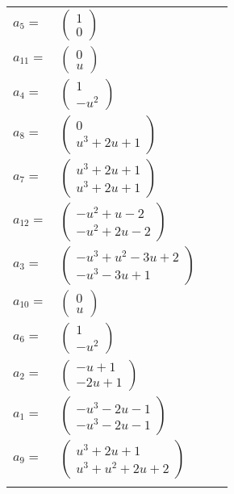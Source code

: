 \documentclass[1p]{elsarticle_modified}
\theoremstyle{definition}
\begin{document}
\begin{tabular}{m{7pt} m{180pt} m{7pt} m{180pt} }
\flushright $a_{5}=$&$\begin{pmatrix}1\\0\end{pmatrix}$ \\
\flushright $a_{11}=$&$\begin{pmatrix}0\\u\end{pmatrix}$ \\
\flushright $a_{4}=$&$\begin{pmatrix}1\\- u^2\end{pmatrix}$ \\
\flushright $a_{8}=$&$\begin{pmatrix}0\\u^3+2 u+1\end{pmatrix}$ \\
\flushright $a_{7}=$&$\begin{pmatrix}u^3+2 u+1\\u^3+2 u+1\end{pmatrix}$ \\
\flushright $a_{12}=$&$\begin{pmatrix}- u^2+u-2\\- u^2+2 u-2\end{pmatrix}$ \\
\flushright $a_{3}=$&$\begin{pmatrix}- u^3+u^2-3 u+2\\- u^3-3 u+1\end{pmatrix}$ \\
\flushright $a_{10}=$&$\begin{pmatrix}0\\u\end{pmatrix}$ \\
\flushright $a_{6}=$&$\begin{pmatrix}1\\- u^2\end{pmatrix}$ \\
\flushright $a_{2}=$&$\begin{pmatrix}- u+1\\-2 u+1\end{pmatrix}$ \\
\flushright $a_{1}=$&$\begin{pmatrix}- u^3-2 u-1\\- u^3-2 u-1\end{pmatrix}$ \\
\flushright $a_{9}=$&$\begin{pmatrix}u^3+2 u+1\\u^3+u^2+2 u+2\end{pmatrix}$\\&\end{tabular}
\end{document}
